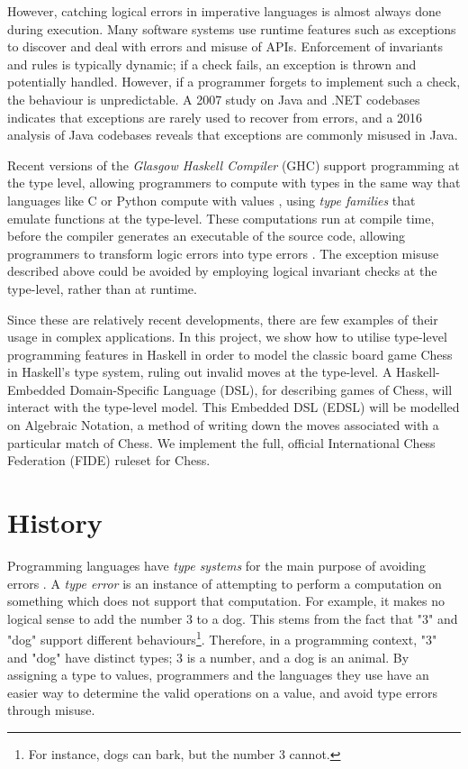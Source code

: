 \documentclass[12pt, a4paper, bibliography=totocnumbered]{scrreprt}
\begin{document}
However, catching logical errors in imperative languages is almost always done during execution. Many software systems use runtime features such as exceptions to discover and deal with errors and misuse of APIs. Enforcement of invariants and rules is typically dynamic; if a check fails, an exception is thrown and potentially handled. However, if a programmer forgets to implement such a check, the behaviour is unpredictable. A 2007 study \cite{exceptionsusedpoorly} on Java and .NET codebases indicates that exceptions are rarely used to recover from errors, and a 2016 analysis of Java codebases \cite{badjavaexceptions} reveals that exceptions are commonly misused in Java.

Recent versions of the \emph{Glasgow Haskell Compiler} (GHC) support programming at the type level, allowing programmers to compute with types in the same way that languages like C or Python compute with values \cite{yorgey2012giving}, using \emph{type families} \cite{opentfs} \cite{closedtfs} that emulate functions at the type-level. These computations run at compile time, before the compiler generates an executable of the source code, allowing programmers to transform logic errors into type errors \cite{twt}. The exception misuse described above could be avoided by employing logical invariant checks at the type-level, rather than at runtime.

Since these are relatively recent developments, there are few examples of their usage in complex applications. In this project, we show how to utilise type-level programming features in Haskell in order to model the classic board game Chess in Haskell's type system, ruling out invalid moves at the type-level. A Haskell-Embedded Domain-Specific Language (DSL), for describing games of Chess, will interact with the type-level model. This Embedded DSL (EDSL) will be modelled on Algebraic Notation, a method of writing down the moves associated with a particular match of Chess. We implement the full, official International Chess Federation (FIDE) ruleset for Chess.

\chapter{History}

Programming languages have \emph{type systems} for the main purpose of avoiding errors \cite{cardellitypes}. A \emph{type error} is an instance of attempting to perform a computation on something which does not support that computation. For example, it makes no logical sense to add the number 3 to a dog. This stems from the fact that "3" and "dog" support different behaviours\footnote{For instance, dogs can bark, but the number 3 cannot.}. Therefore, in a programming context, "3" and "dog" have distinct types; 3 is a number, and a dog is an animal. By assigning a type to values, programmers and the languages they use have an easier way to determine the valid operations on a value, and avoid type errors through misuse.
\end{document}
